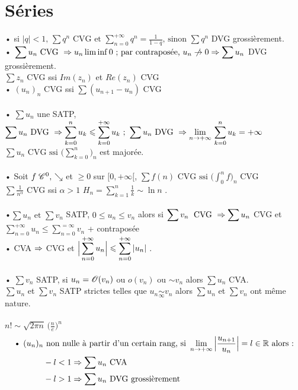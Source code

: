 \documentclass[12 pt]{exampleclass}
\begin{document}
\section{Séries}
• si $\displaystyle{|q| < 1, \, \sum q^n\text{ CVG et }\sum_{n=0}^{+\infty} q^n = \frac{1}{1-q}\text{, sinon } \sum q^n}$ DVG grossièrement.\\
• $\displaystyle{\sum u_n \text{ CVG } \Ra u_n\liminf 0}\text{ ; par contraposée, }u_n\centernot\ra 0 \Ra \sum u_n $ DVG grossièrement.\\
$\displaystyle{\sum z_n}$ CVG ssi $Im(z_n)$ et $Re(z_n)$ CVG\\
• $(u_n)_n$ CVG ssi $\displaystyle{\sum (u_{n+1} - u_n)}$ CVG\\
\text{}\\
• $\displaystyle{\sum u_n}$ une SATP, \;$\displaystyle{\sum u_n \text{ DVG }\Rightarrow\sum_{k=0}^n  u_k \leqslant \sum_{k=0}^{+\infty} u_k \ ; \ \sum u_n \text{ DVG } \Rightarrow\lim_{n \to +\infty}\, \sum_{k=0}^n u_k = +\infty}$\\
$\displaystyle{\sum u_n\text{ CVG ssi } \Big(\sum_{k=0}^n\Big)_n}$ est majorée.\\
\text{}\\
• Soit $f \; \mathscr{C}^0, \, \searrow$ et $\geqslant 0$ sur $[0, +\infty[$, $\displaystyle{\sum f(n) \text{ CVG ssi } \Big(\int_0^n f \Big)_n}$ CVG\\
$\displaystyle{\sum \frac{1}{n^\alpha}}$ CVG ssi $\alpha > 1$ \qquad $\displaystyle{H_n = \sum_{k=1}^n \frac{1}{k}  \sim \ln{n}}$ .\\
\text{}\\
•$\displaystyle{\sum u_n\text{ et } \sum v_n}$ SATP, $0\leqslant u_n \leqslant v_n$ alors si $\displaystyle{\sum v_n \; \text{ CVG } \Rightarrow\sum u_n}$ CVG et $\displaystyle{\sum_{n=0}^{+\infty} u_n \leqslant  \sum_{n=0}^{=\infty} v_n}$ + contraposée\\
• CVA $\Rightarrow$ CVG et $\displaystyle{\Big| \sum_{n=0}^{+\infty} u_n \Big| \leqslant \sum_{n=0}^{+\infty}|u_n|}$ .\\
\text{}\\
• $\sum v_n$ SATP, si $u_n = \mathscr{O} (v_n)$ ou $o(v_n)$ ou $\sim v_n$ alors $\sum u_n$ CVA.\\
$\sum u_n$ et $\sum v_n$ SATP strictes telles que $u_n \underset{\infty}{\sim} v_n$ alors $\sum u_n$ et $\sum v_n$ ont même nature.\\
\text{}\\
$n! \sim \sqrt{2\pi n}\, \Big(\frac{n}{e}\Big)^n$\\
\begin{equation*}
\begin{aligned}
\text{• }(u_n)_n &\text{ non nulle à partir d'un certain rang, si } \lim_{n\to +\infty} \Big|\frac{u_{n+1}}{u_n} \Big| = l\in\mathbb{R}\text{ alors :}\\
& - l<1 \Rightarrow \sum u_n \text{ CVA}\\
& - l>1 \Rightarrow \sum u_n \text{ DVG grossièrement}\\
\end{aligned}
\end{equation*}
\end{document}
